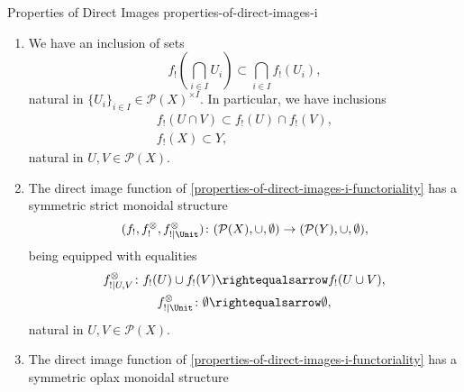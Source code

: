 \begin{proposition}{Properties of Direct Images \rmI}{properties-of-direct-images-i}
\begin{enumerate}
            \[
                f_{!}\left(\bigcup_{i\in I}U_{i}\right)%
                =%
                \bigcup_{i\in I}f_{!}(U_{i}),%
            \]%
            natural in $\{U_{i}\}_{i\in I}\in\mathcal{P}(X)^{\times I}$. In particular, we have equalities%
            \[
                \begin{gathered}
                    f_{!}(U)\cup f_{!}(V)                  = f_{!}(U\cup V),\\
                    f_{!}(\emptyset)                       = \emptyset,
                \end{gathered}
            \]%
            natural in $U,V\in\mathcal{P}(X)$.
        \item\label{properties-of-direct-images-i-oplax-preservation-of-limits}We have an inclusion of sets
            \[
                f_{!}\left(\bigcap_{i\in I}U_{i}\right)%
                \subset%
                \bigcap_{i\in I}f_{!}(U_{i}),%
            \]%
            natural in $\{U_{i}\}_{i\in I}\in\mathcal{P}(X)^{\times I}$. In particular, we have inclusions%
            \[
                \begin{gathered}
                    f_{!}(U\cap V) \subset f_{!}(U)\cap f_{!}(V),\\
                    f_{!}(X)        \subset Y,
                \end{gathered}
            \]%
            natural in $U,V\in\mathcal{P}(X)$.
        \item\label{properties-of-direct-images-i-symmetric-strict-monoidality-with-respect-to-unions}The direct image function of \cref{properties-of-direct-images-i-functoriality} has a symmetric strict monoidal structure
            \[
                (f_{!},f^{\otimes}_{!},f^{\otimes}_{!|\Unit})
                \colon
                (\mathcal{P}(X),\cup,\emptyset)
                \to
                (\mathcal{P}(Y),\cup,\emptyset),
            \]%
            being equipped with equalities%
            \[
                \begin{gathered}
                    f^{\otimes}_{!|U,V}   \colon f_{!}(U)\cup f_{!}(V) \rightequalsarrow f_{!}(U\cup V),\\
                    f^{\otimes}_{!|\Unit} \colon \emptyset             \rightequalsarrow \emptyset,
                \end{gathered}
            \]%
            natural in $U,V\in\mathcal{P}(X)$.
        \item\label{properties-of-direct-images-i-symmetric-oplax-monoidality-with-respect-to-intersections}The direct image function of \cref{properties-of-direct-images-i-functoriality} has a symmetric oplax monoidal structure

\end{enumerate}
\end{proposition}
